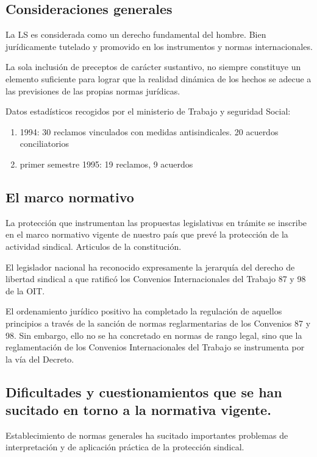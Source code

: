 \documentclass[spanish,12pt,a4paper,titlepage]{report}
\begin{document}
\subsection{Consideraciones generales}

La LS es considerada como un derecho fundamental del hombre. Bien jurídicamente tutelado y promovido en los instrumentos y normas internacionales. 

La sola inclusión de preceptos de carácter sustantivo, no siempre constituye un elemento suficiente para lograr que la realidad dinámica de los hechos se adecue a las previsiones de las propias normas jurídicas.

Datos estadísticos recogidos por el ministerio de Trabajo y seguridad Social:

\begin{enumerate}
\item 1994: 30 reclamos vinculados con medidas antisindicales. 20 acuerdos conciliatorios
\item primer semestre 1995: 19 reclamos, 9 acuerdos
\end{enumerate}

\subsection{El marco normativo}

La protección que instrumentan las propuestas legislativas en trámite se inscribe en el marco normativo vigente de nuestro país que prevé la protección de la actividad sindical. Articulos de la constitución.

El legislador nacional ha reconocido expresamente la jerarquía del derecho de libertad sindical a que ratificó los Convenios Internacionales del Trabajo 87 y 98  de la OIT.

El ordenamiento jurídico positivo ha completado la regulación de aquellos principios a través de la sanción de normas reglarmentarias de los Convenios 87 y 98. Sin embargo, ello no se ha concretado en normas de rango legal, sino que la reglamentación de los Convenios Internacionales del Trabajo se instrumenta por la vía del Decreto.

\subsection{Dificultades y cuestionamientos que se han sucitado en torno a la normativa vigente.}

Establecimiento de normas generales ha sucitado importantes problemas de interpretación y de aplicación práctica de la protección sindical.
\end{document}
